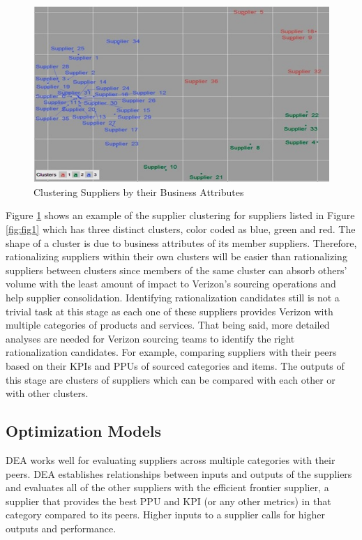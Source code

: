 \documentclass[inte,nonblindrev]{informs3} %
\begin{document}
\begin{figure}
	\includegraphics[width=1.0\textwidth]{Cluster.jpg}
    \caption{Clustering Suppliers by their Business Attributes }
    \label{fig:fig3}
\end{figure}

Figure \ref{fig:fig3} shows an example of the supplier clustering for suppliers listed in  Figure \ref{fig:fig1} which has three distinct clusters, color coded as blue, green and red. The shape of a cluster is due to business attributes of its member suppliers. Therefore, rationalizing suppliers within their own clusters will be easier than rationalizing suppliers between clusters since members of the same cluster can absorb others' volume with the least amount of impact to Verizon's sourcing operations and help supplier consolidation. Identifying rationalization candidates still is not a trivial task at this stage as each one of these suppliers provides Verizon with multiple categories of products and services. That being said, more detailed analyses are needed for Verizon sourcing teams to identify the right rationalization candidates. For example, comparing suppliers with their peers based on their KPIs and PPUs of sourced categories and items. The outputs of this stage are clusters of suppliers which can be compared with each other or with other clusters. 

\subsection{Optimization Models}
DEA works well for evaluating suppliers across multiple categories with their peers. DEA establishes relationships between inputs and outputs of the suppliers and evaluates all of the other suppliers with the efficient frontier supplier, a supplier that provides the best PPU and KPI (or any other metrics) in that category compared to its peers. Higher inputs to a supplier calls for higher outputs and performance.
\end{document}
